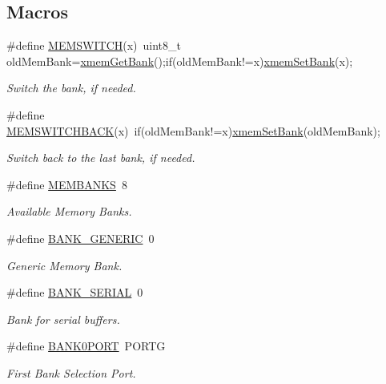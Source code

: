 \subsection*{Macros}
\begin{DoxyCompactItemize}
\item 
\#define \hyperlink{group__xmem_ga253830e5022f2aa99177acd8a0ba0bfe}{M\-E\-M\-S\-W\-I\-T\-C\-H}(x)~uint8\-\_\-t old\-Mem\-Bank=\hyperlink{group__xmem_ga575f63170f6fc636556f8d955cbd42cd}{xmem\-Get\-Bank}();if(old\-Mem\-Bank!=x)\hyperlink{group__xmem_ga619fa66b9f38be684f4331951fc91730}{xmem\-Set\-Bank}(x);
\begin{DoxyCompactList}\small\item\em Switch the bank, if needed. \end{DoxyCompactList}\item 
\#define \hyperlink{group__xmem_ga96199c8c5e6fbc65dd60aa67de63fd34}{M\-E\-M\-S\-W\-I\-T\-C\-H\-B\-A\-C\-K}(x)~if(old\-Mem\-Bank!=x)\hyperlink{group__xmem_ga619fa66b9f38be684f4331951fc91730}{xmem\-Set\-Bank}(old\-Mem\-Bank);
\begin{DoxyCompactList}\small\item\em Switch back to the last bank, if needed. \end{DoxyCompactList}\item 
\#define \hyperlink{group__xmem_ga1ed280cb3dd0a4a03aeda6aaccc180d3}{M\-E\-M\-B\-A\-N\-K\-S}~8
\begin{DoxyCompactList}\small\item\em Available Memory Banks. \end{DoxyCompactList}\item 
\#define \hyperlink{group__xmem_ga6b1167d0078b33af8ec17ededaebe0cb}{B\-A\-N\-K\-\_\-\-G\-E\-N\-E\-R\-I\-C}~0
\begin{DoxyCompactList}\small\item\em Generic Memory Bank. \end{DoxyCompactList}\item 
\#define \hyperlink{group__xmem_gaa5177871b2303418ed492a18405273f9}{B\-A\-N\-K\-\_\-\-S\-E\-R\-I\-A\-L}~0
\begin{DoxyCompactList}\small\item\em Bank for serial buffers. \end{DoxyCompactList}\item 
\#define \hyperlink{group__xmem_gabeec1986c81588dde8863b7936028fc9}{B\-A\-N\-K0\-P\-O\-R\-T}~P\-O\-R\-T\-G
\begin{DoxyCompactList}\small\item\em First Bank Selection Port. \end{DoxyCompactList}\item 

\end{DoxyCompactItemize}
